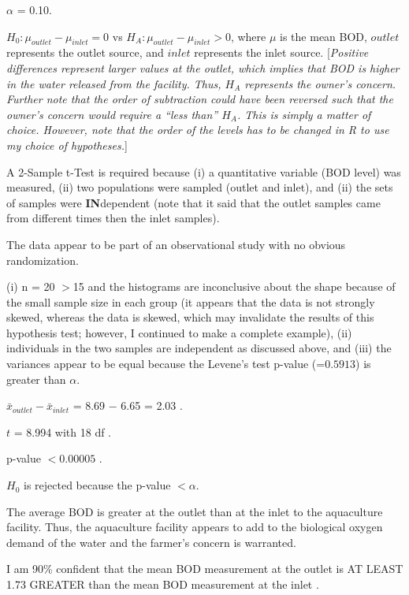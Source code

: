 \documentclass[10pt,openany]{book}\usepackage[]{graphicx}\usepackage[]{color}
\begin{document}
\begin{Enumerate}
  \item $\alpha$ = 0.10.
  \item $H_{0}:\mu_{outlet}-\mu_{inlet}=0$ vs $H_{A}:\mu_{outlet}-\mu_{inlet}>0$, where $\mu$ is the mean BOD, $outlet$ represents the outlet source, and $inlet$ represents the inlet source. [\textit{Positive differences represent larger values at the outlet, which implies that BOD is higher in the water released from the facility. Thus, $H_{A}$ represents the owner's concern. Further note that the order of subtraction could have been reversed such that the owner's concern would require a ``less than'' $H_{A}$. This is simply a matter of choice. However, note that the order of the levels has to be changed in R to use my choice of hypotheses.}]
  \item A 2-Sample t-Test is required because (i) a quantitative variable (BOD level) was measured, (ii) two populations were sampled (outlet and inlet), and (ii) the sets of samples were \textbf{IN}dependent (note that it said that the outlet samples came from different times then the inlet samples).
  \item The data appear to be part of an observational study with no obvious randomization.
  \item (i) n = 20 $>$15 and the histograms  are inconclusive about the shape because of the small sample size in each group (it appears that the  data is not strongly skewed, whereas the  data is skewed, which may invalidate the results of this hypothesis test; however, I continued to make a complete example), (ii) individuals in the two samples are independent as discussed above, and (iii) the variances appear to be equal because the Levene's test p-value (=$0.5913$) is greater than $\alpha$.
  \item $\bar{x}_{outlet}-\bar{x}_{inlet}$ = 8.69 $-$ 6.65 = 2.03 .
  \item $t$ = 8.994 with 18 df .
  \item p-value $<0.00005$ .
  \item $H_{0}$ is rejected because the p-value $<\alpha$.
  \item The average BOD is greater at the outlet than at the inlet to the aquaculture facility. Thus, the aquaculture facility appears to add to the biological oxygen demand of the water and the farmer's concern is warranted.
  \item I am 90\% confident that the mean BOD measurement at the outlet is AT LEAST 1.73 GREATER than the mean BOD measurement at the inlet .
\end{Enumerate}
\end{document}
